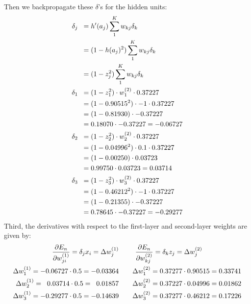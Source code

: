 \documentclass[a4paper,10pt]{article}
\numberwithin{equation}{section} %
\numberwithin{figure}{section} %
\numberwithin{table}{section} %
\theoremstyle{mytheor}
\begin{document}
\begin{enumerate}
\begin{align*}
		\end{align*}
		Then we backpropagate these $\delta$'s for the hidden units:
		\begin{align*}
		\delta_j \hspace{0.2cm} &= h'(a_j) \sum_1^K w_{kj} \delta_k\\
			 &= (1 - h(a_j)^2) \sum_1^K w_{kj} \delta_k\\
			 &= (1 - z_j^2) \sum_1^K w_{kj} \delta_k\\
		\delta_1\hspace{0.2cm}  &= (1 - z_1^2) \cdot w_{1}^{(2)} \cdot 0.37227\\
			 &= (1 - 0.90515^2) \cdot -1 \cdot 0.37227\\
			 &= (1 - 0.81930) \cdot -0.37227\\
			 &= 0.18070 \cdot -0.37227 = -0.06727\\
		\delta_2 \hspace{0.2cm} &= (1 - z_2^2) \cdot w_{2}^{(2)} \cdot 0.37227\\
			 &= (1 - 0.04996^2) \cdot 0.1 \cdot 0.37227\\
			 &= (1 - 0.00250) \cdot 0.03723\\
			 &= 0.99750 \cdot 0.03723 = 0.03714\\
		\delta_3 \hspace{0.2cm} &= (1 - z_3^2) \cdot w_{3}^{(2)} \cdot 0.37227\\
			 &= (1 - 0.46212^2) \cdot -1 \cdot 0.37227\\
			 &= (1 - 0.21355) \cdot -0.37227\\
			 &= 0.78645 \cdot -0.37227 = -0.29277
		\end{align*}
		Third, the derivatives with respect to the first-layer and second-layer weights are given by:
		\begin{align*}
		\frac{\partial E_n}{\partial w_{ji}^{(1)}} = \delta_j x_i = \Delta w_{j}^{(1)} & & & & \frac{\partial E_n}{\partial w_{kj}^{(2)}} = \delta_k z_j = \Delta w_{j}^{(2)} \hspace{2cm}\\
		 \Delta w_{1}^{(1)} = -0.06727 \cdot 0.5 = -0.03364 & & & &  \Delta w_{1}^{(2)}  = 0.37277 \cdot 0.90515 = 0.33741\\
		 \Delta w_{2}^{(1)} = \hspace{0.2cm} 0.03714 \cdot 0.5 = \hspace{0.2cm} 0.01857	& & & &   \Delta w_{2}^{(2)}  = 0.37227 \cdot 0.04996 = 0.01862 \\
		  \Delta w_{3}^{(1)} = -0.29277 \cdot 0.5 = -0.14639 & & & &   \Delta w_{3}^{(2)} = 0.37277 \cdot 0.46212 = 0.17226 

\end{align*}
\end{enumerate}
\end{document}
